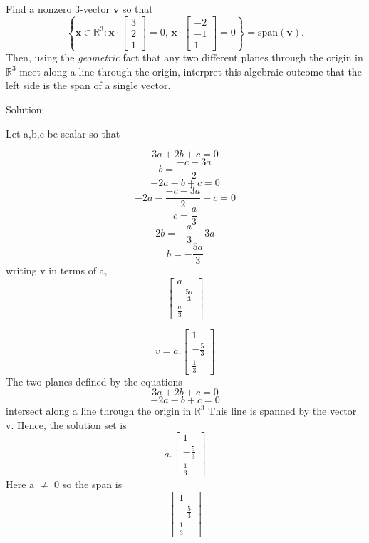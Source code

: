 

Find a nonzero 3-vector \(\mathbf{v}\) so that
\[
\left\{
\mathbf{x} \in \mathbb{R}^3 : \mathbf{x} \cdot 
\begin{bmatrix}
3 \\
2 \\
1
\end{bmatrix} 
= 0, \, 
\mathbf{x} \cdot 
\begin{bmatrix}
-2 \\
-1 \\
1
\end{bmatrix} 
= 0
\right\}
= \text{span}(\mathbf{v}).
\]
Then, using the \textit{geometric} fact that any two different planes through the origin in \(\mathbb{R}^3\) meet along a line through the origin, interpret this algebraic outcome that the left side is the span of a single vector.

Solution:

Let a,b,c be scalar so that 

\[
3a+2b+c=0
\]
\begin{equation}
    b = \frac{-c-3a}{2}
\end{equation}
\[
-2a-b+c=0
\]
\[
-2a- \frac{-c-3a}{2}+c=0
\]
\[
c=\frac{a}{3}
\]
\[
2b=-\frac{a}{3}-3a
\]
\[
b=-\frac{5a}{3}
\]
writing v in terms of a,
\[
\begin{bmatrix}
a \\
-\frac{5a}{3} \\
\frac{a}{3}
\end{bmatrix} 
\]

\[
v =
a .  \begin{bmatrix}
1\\
-\frac{5}{3} \\
\frac{1}{3}
\end{bmatrix} 
\]
The two planes defined by the equations
\begin{equation}
    3a+2b+c=0
\end{equation}
\begin{equation}
    -2a-b+c=0
\end{equation}
intersect along a line through the origin in \(\mathbb{R}^3\)
This line is spanned by the vector v. Hence, the solution set is
\[
a .  \begin{bmatrix}
1\\
-\frac{5}{3} \\
\frac{1}{3}
\end{bmatrix} 
\]
Here a $\neq$ 0
so the span is
\[
\begin{bmatrix}
1\\
-\frac{5}{3} \\
\frac{1}{3}
\end{bmatrix} 
\]